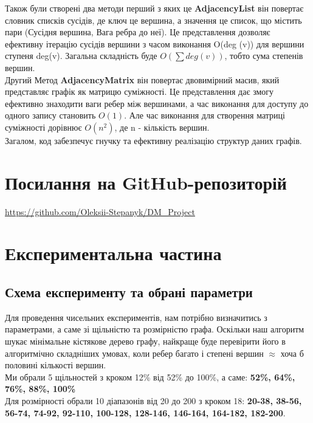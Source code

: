 \documentclass[12pt, letterpaper, twoside]{article}
\begin{document}
Також були створені два методи перший з яких це \textbf {AdjacencyList} він повертає словник списків сусідів, де ключ це вершина, а значення це список, що містить пари (Сусідня вершина, Вага ребра до неї). Це представлення дозволяє ефективну ітерацію сусідів вершини з часом виконання O(deg (v)) для вершини ступеня deg(v). Загальна складність буде $O(\sum deg(v))$, тобто сума степенів вершин.\\
Другий Метод \textbf{AdjacencyMatrix} він повертає двовимірний масив, який представляє графік як матрицю суміжності. Це представлення дає змогу ефективно знаходити ваги ребер між вершинами, а час виконання для доступу до одного запису становить $O(1)$. Але час виконання для створення матриці суміжності дорівнює $O(n^{2})$, де n - кількість вершин.\\
Загалом, код забезпечує гнучку та ефективну реалізацію структур даних графів.



\section{Посилання на GitHub-репозиторій}
\url{https://github.com/Oleksii-Stepanyk/DM_Project}

\section{Експериментальна частина}
\subsection{Схема експерименту та обрані параметри}
Для проведення чисельних експериментів, нам потрібно визначитись з параметрами, а саме зі щільністю та розмірністю графа.
Оскільки наш алгоритм шукає мінімальне кістякове дерево графу, найкраще буде перевірити його в алгоритмічно складніших умовах, коли ребер багато і степені вершин $\approx$ хоча б половині кількості вершин.\\

Ми обрали 5 щільностей з кроком 12\% від 52\% до 100\%, а саме: \textbf{52\%, 64\%, 76\%, 88\%, 100\%} \\
Для розмірності обрали 10 діапазонів від 20 до 200 з кроком 18: \textbf{20-38, 38-56, 56-74, 74-92, 92-110, 100-128, 128-146, 146-164, 164-182, 182-200}.\\
\end{document}
